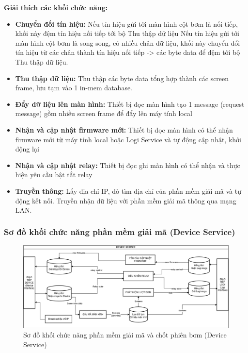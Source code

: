 \textbf{Giải thích các khối chức năng:} 

\begin{itemize}
    \item \textbf{Chuyển đối tín hiệu: }
    \subitem Nếu tín hiệu gửi tới màn hình cột bơm là nối tiếp, khối này đệm tín hiệu nối tiếp tới bộ Thu thập dữ liệu
    \subitem Nếu tín hiệu gửi tới màn hình cột bơm là song song, có nhiều chân dữ liệu, khối này chuyển đổi tín hiệu từ các chân thành tín hiệu nối tiếp -> các byte data để đệm tới bộ Thu thập dữ liệu.
    \item \textbf{Thu thập dữ liệu: } Thu thập các byte data tổng hợp thành các screen frame, lưu tạm vào 1 in-mem database.
    \item \textbf{Đẩy dữ liệu lên màn hình: } Thiết bị đọc màn hình tạo 1 message (request message) gồm nhiều screen frame để đẩy lên máy tính local
    \item \textbf{Nhận và cập nhật firmware mới: } Thiết bị đọc màn hình có thể nhận firmware mới từ máy tính local hoặc Logi Service và tự động cập nhật, khởi động lại
    \item \textbf{Nhận và cập nhật relay:} Thiết bị đọc ghi màn hình có thể nhận và thực hiện yêu cầu bật tắt relay 
    \item \textbf{Truyền thông:} Lấy địa chỉ IP, dò tìm địa chỉ của phần mềm giải mã và tự động kết nối. Truyền nhận dữ liệu với phần mềm giải mã thông qua mạng LAN.

\end{itemize}

\subsubsection{Sơ đồ khối chức năng phần mềm giải mã (Device Service)}

\begin{figure}[!ht]
    \centering
    \includegraphics[width=1.0\linewidth]{Figures/Chap3_DeviceService-function-block.png}
    \caption{Sơ đồ khối chức năng phần mềm giải mã và chốt phiên bơm (Device Service)}
    \label{fig:hinh3.3}
\end{figure}




















